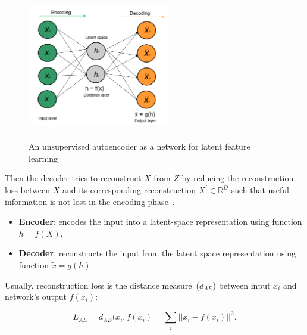 \begin{figure}[h]
    \centering
    \includegraphics[width=0.55\textwidth,height=65mm]{images/ae.png}
    \caption{An unsupervised autoencoder as a network for latent feature learning~\cite{karimDLTF2018}}
    \label{fig:ae_theory1}
    \vspace{-2mm}
\end{figure}

\hspace*{3.5mm} Then the decoder tries to reconstruct $X$ from $Z$ by reducing the reconstruction loss between $X$ and its corresponding reconstruction $X^{\prime} \in \mathbb{R}^{D}$ such that useful information is not lost in the encoding phase~\cite{KarimIEEEAccess2019}.

\vspace{-2mm}
\begin{itemize}[noitemsep]
    \item \textbf{Encoder}: encodes the input into a latent-space representation using function $h = f(X)$.
    \item \textbf{Decoder}: reconstructs the input from the latent space representation using function $\tilde{x} = g(h)$. 
\end{itemize}
\vspace{-2mm}

Usually, reconstruction loss is the distance measure~($d_{AE}$) between input $x_i$ and network's output $f(x_i)$: 

\vspace{-2mm}
\begin{equation}
    L_{AE}=\text{$d_{AE}$}(x_i, f(x_i) = \sum_{i} ||x_{i}-f(x_i)||^{2}.
    \label{eq:Loss1}
\end{equation}

